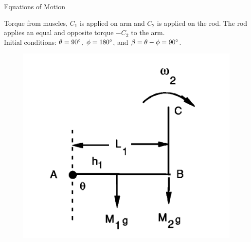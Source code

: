 \documentclass[tikz]{beamer}
\begin{document}
\begin{frame} {Equations of Motion}
	\only<4> {
		Torque from muscles, $C_1$ is applied on arm and $C_2$ is applied on the rod. The rod applies an equal and opposite torque $-C_2$ to the arm. \\
		Initial conditions: $\theta = 90\degree$, $\phi = 180\degree$, and $\beta = \theta - \phi = 90\degree$.

		\begin{figure}
			\centering
			\includegraphics[scale=0.4]{wristcock.png}
		\end{figure}
	}


\end{frame}
\end{document}
